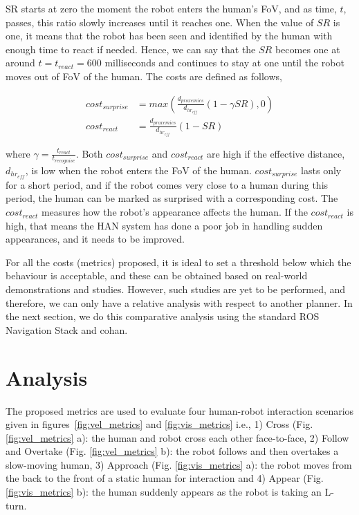 SR starts at zero the moment the robot enters the human's FoV, and as time, $t$, passes, this ratio slowly increases until it reaches one. When the value of $SR$ is one, it means that the robot has been seen and identified by the human with enough time to react if needed. Hence, we can say that the $SR$ becomes one at around $t = t_{react} = 600$ milliseconds and continues to stay at one until the robot moves out of FoV of the human. The costs are defined as follows,

\begin{align}
    cost_{surprise} &=max\left(\frac{d_{proxemics}}{d_{hr_{eff}}}(1-\gamma SR) , 0\right)\\
    cost_{react} &= \frac{d_{proxemics}}{d_{hr_{eff}}}\left(1-SR\right)
\end{align}

where $\gamma = \frac{t_{react}}{t_{recognise}}$. Both $cost_{surprise}$ and $cost_{react}$ are high if the effective distance, $d_{hr_{eff}}$, is low when the robot enters the FoV of the human. $cost_{surprise}$ lasts only for a short period, and if the robot comes very close to a human during this period, the human can be marked as surprised with a corresponding cost. The $cost_{react}$ measures how the robot's appearance affects the human. If the $cost_{react}$ is high, that means the HAN system has done a poor job in handling sudden appearances, and it needs to be improved.  

For all the costs (metrics) proposed, it is ideal to set a threshold below which the behaviour is acceptable, and these can be obtained based on real-world demonstrations and studies. However, such studies are yet to be performed, and therefore, we can only have a relative analysis with respect to another planner. In the next section, we do this comparative analysis using the standard ROS Navigation Stack and \acrshort{cohan}.

\section{Analysis}\label{metrics_eval}
The proposed metrics are used to evaluate four human-robot interaction scenarios given in figures~\ref{fig:vel_metrics} and \ref{fig:vis_metrics} i.e., 1) Cross (Fig. \ref{fig:vel_metrics} a): the human and robot cross each other face-to-face, 2) Follow and Overtake (Fig. \ref{fig:vel_metrics} b): the robot follows and then overtakes a slow-moving human, 3) Approach (Fig. \ref{fig:vis_metrics} a): the robot moves from the back to the front of a static human for interaction and 4) Appear (Fig. \ref{fig:vis_metrics} b): the human suddenly appears as the robot is taking an L-turn. 

